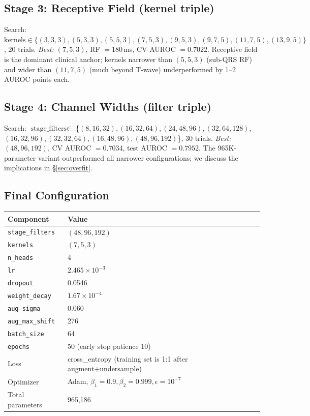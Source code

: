 \documentclass[11pt]{article}
\begin{document}
\subsection{Stage 3: Receptive Field (kernel triple)}

Search: $\text{kernels} \in \{(3,3,3), (5,3,3), (5,5,3), (7,5,3), (9,5,3), (9,7,5), (11,7,5), (13,9,5)\}$, 20 trials. \emph{Best:} $(7, 5, 3)$, RF $= 180$\,ms, CV AUROC $= 0.7022$. Receptive field is the dominant clinical anchor; kernels narrower than $(5,5,3)$ (sub-QRS RF) and wider than $(11,7,5)$ (much beyond T-wave) underperformed by 1--2 AUROC points each.

\subsection{Stage 4: Channel Widths (filter triple)}

Search: $\text{stage\_filters} \in$ \{$(8,16,32), (16,32,64), (24,48,96), (32,64,128)$, $(16,32,96), (32,32,64), (16,48,96), (48,96,192)$\}, 30 trials. \emph{Best:} $(48, 96, 192)$, CV AUROC $= 0.7034$, test AUROC $= 0.7952$. The 965K-parameter variant outperformed all narrower configurations; we discuss the implications in \S\ref{sec:overfit}.

\subsection{Final Configuration}

\begin{center}
\begin{tabular}{ll}
\toprule
Component & Value \\
\midrule
\texttt{stage\_filters} & $(48, 96, 192)$ \\
\texttt{kernels}        & $(7, 5, 3)$ \\
\texttt{n\_heads}       & 4 \\
\texttt{lr}             & $2.465 \times 10^{-3}$ \\
\texttt{dropout}        & 0.0546 \\
\texttt{weight\_decay}  & $1.67 \times 10^{-4}$ \\
\texttt{aug\_sigma}     & 0.060 \\
\texttt{aug\_max\_shift} & 276 \\
\texttt{batch\_size}    & 64 \\
\texttt{epochs}         & 50 (early stop patience 10) \\
Loss                    & cross\_entropy (training set is 1:1 after augment+undersample) \\
Optimizer               & Adam, $\beta_1 = 0.9, \beta_2 = 0.999, \epsilon = 10^{-7}$ \\
Total parameters        & 965,186 \\
\bottomrule
\end{tabular}
\end{center}
\end{document}
